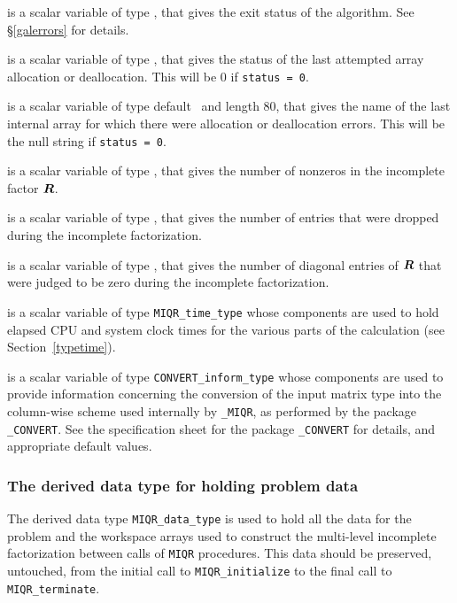 \documentclass{galahad}
\newcommand{\packagename}{MIQR}
\newcommand{\fullpackagename}{\libraryname\_\packagename}
\begin{document}
\begin{description}

 is a scalar variable of type \integer, that gives the
exit status of the algorithm. 
See \S\ref{galerrors} 
for details.

 is a scalar variable of type \integer, that gives
the status of the last attempted array allocation or deallocation.
This will be 0 if {\tt status = 0}.

 is a scalar variable of type default \character\
and length 80, that  gives the name of the last internal array 
for which there were allocation or deallocation errors.
This will be the null string if {\tt status = 0}. 

 is a scalar variable of type \integer, that 
gives the number of nonzeros in the incomplete factor ${\bm{R}}$.

 is a scalar variable of type \integer, that 
gives the number of entries that were dropped during the incomplete 
factorization.

 is a scalar variable of type \integer, that 
gives the number of diagonal entries of ${\bm{R}}$ that were judged to be zero
during the incomplete factorization.

 is a scalar variable of type {\tt \packagename\_time\_type} 
whose components are used to hold elapsed CPU and system clock times for 
the various parts of the calculation (see Section~\ref{typetime}).

 is a scalar variable of type 
{\tt CONVERT\_inform\_type}
whose components are used to provide information concerning
the conversion of the input matrix type into the column-wise scheme 
used internally by  {\tt \fullpackagename}, as performed by the package 
{\tt \libraryname\_CONVERT}. 
See the specification sheet for the package 
{\tt \libraryname\_CONVERT} 
for details, and appropriate default values.

\end{description}


\subsubsection{The derived data type for holding problem data}\label{typedata}
The derived data type
{\tt \packagename\_data\_type} 
is used to hold all the data for the problem and the workspace arrays 
used to construct the multi-level incomplete factorization between calls of 
{\tt \packagename} procedures. 
This data should be preserved, untouched, from the initial call to 
{\tt \packagename\_initialize}
to the final call to
{\tt \packagename\_terminate}.
\end{document}
